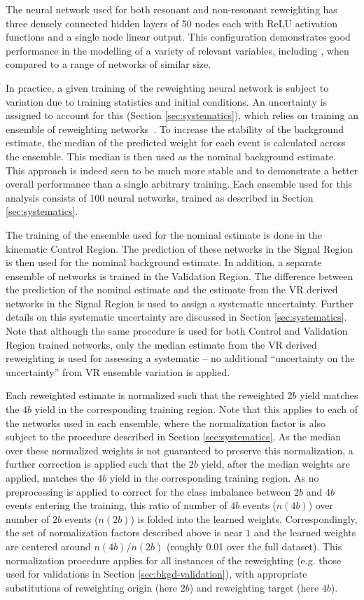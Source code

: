 The neural network used for both resonant and non-resonant reweighting has three 
densely connected hidden layers of 50 nodes each with ReLU activation functions and a single node 
linear output. This configuration demonstrates good performance in the modelling 
of a variety of relevant variables, including \mhh, when compared to a 
range of networks of similar size.

In practice, a given training of the reweighting neural network is subject to variation
due to training statistics and initial conditions. An uncertainty is assigned to account
for this (Section \ref{sec:systematics}), which relies on training an ensemble of
reweighting networks~\cite{DeepEnsembles}. To increase the stability of the background estimate,
the median of the predicted weight for each event is calculated across the ensemble.
This median is then used as the nominal background estimate. This approach is indeed 
seen to be much more stable and to demonstrate a better overall performance than a 
single arbitrary training. Each ensemble used for this analysis consists of 100 
neural networks, trained as described in Section \ref{sec:systematics}.

The training of the ensemble used for the nominal estimate is done in the kinematic
Control Region. The prediction of these networks in the Signal Region is then used
for the nominal background estimate. In addition, a separate ensemble of networks is 
trained in the Validation Region. The difference between the prediction of the nominal 
estimate and the estimate from the VR derived networks in the Signal Region is used to 
assign a systematic uncertainty. Further details on this systematic uncertainty are discussed 
in Section \ref{sec:systematics}.
Note that although the same procedure is used for both Control and Validation Region trained 
networks, only the median estimate from the VR derived reweighting is used for assessing a 
systematic -- no additional ``uncertainty on the uncertainty'' from 
VR ensemble variation is applied.

Each reweighted estimate is normalized such that the reweighted $2b$ yield matches the $4b$ 
yield in the corresponding training region. Note that this applies to each of the networks 
used in each ensemble, where the normalization factor is also subject to the procedure described 
in Section \ref{sec:systematics}. As the median over these normalized weights is not guaranteed 
to preserve this normalization, a further correction is applied such that the $2b$ yield, after 
the median weights are applied, matches the $4b$ yield in the corresponding training region. As no 
preprocessing is applied to correct for the class imbalance between $2b$ and $4b$ events entering 
the training, this ratio of number of $4b$ events ($n(4b)$) over number of $2b$ events ($n(2b)$) is 
folded into the learned weights. Correspondingly, the set of normalization factors described above is 
near $1$ and the learned weights are centered around $n(4b) / n(2b)$ (roughly 0.01 over the full dataset). 
This normalization procedure applies for all instances of the reweighting (e.g. those used for validations 
in Section \ref{sec:bkgd-validation}), with appropriate substitutions of reweighting origin 
(here $2b$) and reweighting target (here $4b$).

